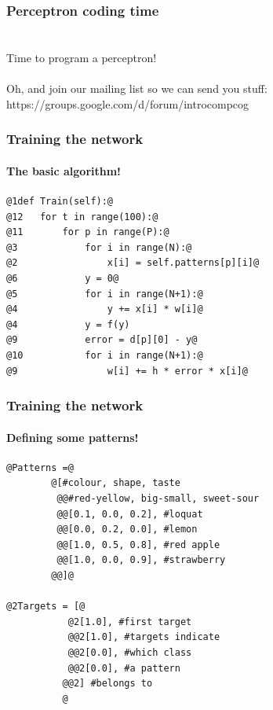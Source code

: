 \documentclass{beamer}
\begin{document}
\begin{frame}
\frametitle{Perceptron coding time}
\framesubtitle{}
        \  \\


 \Huge Time to program a perceptron!
 \   \\  \   \\ 
\normalsize Oh, and join our mailing list so we can send you stuff: https://groups.google.com/d/forum/introcompcog

\end{frame}

\begin{frame}[fragile]
\frametitle{Training the network}
\framesubtitle{The basic algorithm!}
\begin{lstlisting}[style=base]
@1def Train(self):@          
@12   for t in range(100):@
@11       for p in range(P):@     
@3            for i in range(N):@
@2                x[i] = self.patterns[p][i]@
@6            y = 0@
@5            for i in range(N+1):@
@4                y += x[i] * w[i]@
@4            y = f(y)
@9            error = d[p][0] - y@
@10           for i in range(N+1):@
@9                w[i] += h * error * x[i]@
\end{lstlisting}

\end{frame}
\begin{frame}[fragile]
\frametitle{Training the network}
\framesubtitle{Defining some patterns!}
\begin{lstlisting}[style=base]
@Patterns =@
        @[#colour, shape, taste
         @@#red-yellow, big-small, sweet-sour
         @@[0.1, 0.0, 0.2], #loquat 
         @@[0.0, 0.2, 0.0], #lemon 
         @@[1.0, 0.5, 0.8], #red apple 
         @@[1.0, 0.0, 0.9], #strawberry 
        @@]@

@2Targets = [@
           @2[1.0], #first target
           @@2[1.0], #targets indicate 
           @@2[0.0], #which class
           @@2[0.0], #a pattern         
          @@2] #belongs to           
          @

\end{lstlisting}

\end{frame}
\end{document}
